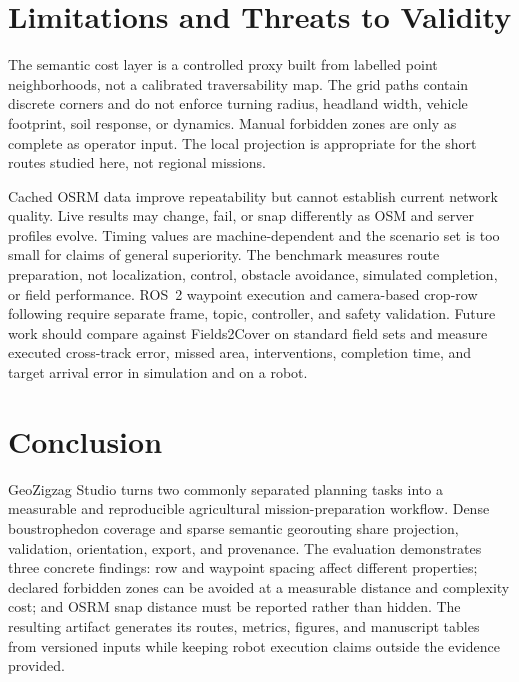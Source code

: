 \documentclass[conference,a4paper]{IEEEtran}
\begin{document}
\newpage
\balance
\section{Limitations and Threats to Validity}
The semantic cost layer is a controlled proxy built from labelled point
neighborhoods, not a calibrated traversability map. The grid paths contain
discrete corners and do not enforce turning radius, headland width, vehicle
footprint, soil response, or dynamics. Manual forbidden zones are only as
complete as operator input. The local projection is appropriate for the short
routes studied here, not regional missions.

Cached OSRM data improve repeatability but cannot establish current network
quality. Live results may change, fail, or snap differently as OSM and server
profiles evolve. Timing values are machine-dependent and the scenario set is
too small for claims of general superiority. The benchmark measures route
preparation, not localization, control, obstacle avoidance, simulated
completion, or field performance. ROS~2 waypoint execution and camera-based
crop-row following require separate frame, topic, controller, and safety
validation. Future work should compare against Fields2Cover on standard field
sets and measure executed cross-track error, missed area, interventions,
completion time, and target arrival error in simulation and on a robot.

\section{Conclusion}
GeoZigzag Studio turns two commonly separated planning tasks into a measurable
and reproducible agricultural mission-preparation workflow. Dense
boustrophedon coverage and sparse semantic georouting share projection,
validation, orientation, export, and provenance. The evaluation demonstrates
three concrete findings: row and waypoint spacing affect different properties;
declared forbidden zones can be avoided at a measurable distance and
complexity cost; and OSRM snap distance must be reported rather than hidden.
The resulting artifact generates its routes, metrics, figures, and manuscript
tables from versioned inputs while keeping robot execution claims outside the
evidence provided.


  {}
  {}
\end{document}

